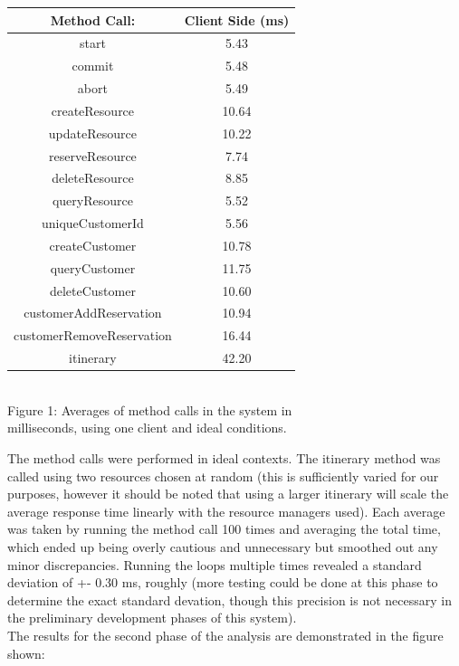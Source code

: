 \documentclass[letterpaper,12pt]{article}
\begin{document}
	\begin{center}
		\begin{tabular}{ |c|c| } 
			\hline
			Method Call: & Client Side (ms) \\
			\hline
			start & 5.43  \\ 
			commit & 5.48  \\ 
			abort & 5.49  \\ 
			createResource & 10.64  \\ 
			updateResource & 10.22  \\ 
			reserveResource & 7.74  \\ 
			deleteResource & 8.85  \\ 
			queryResource & 5.52  \\ 
			uniqueCustomerId & 5.56  \\ 
			createCustomer & 10.78 \\
			queryCustomer & 11.75 \\ 
			deleteCustomer & 10.60 \\ 
			customerAddReservation & 10.94 \\ 
			customerRemoveReservation & 16.44 \\
			itinerary & 42.20\\
			\hline
		\end{tabular}\\
		Figure 1: Averages of method calls in the system in \\milliseconds, using one client and ideal conditions.
	\end{center}
	The method calls were performed in ideal contexts. The itinerary method was called using two resources chosen at random (this is sufficiently varied for our purposes, however it should be noted that using a larger itinerary will scale the average response time linearly with the resource managers used). Each average was taken by running the method call 100 times and averaging the total time, which ended up being overly cautious and unnecessary but smoothed out any minor discrepancies. Running the loops multiple times revealed a standard deviation of +- 0.30 ms, roughly (more testing could be done at this phase to determine the exact standard devation, though this precision is not necessary in the preliminary development phases of this system).\\
	
	The results for the second phase of the analysis are demonstrated in the figure shown:\\
\end{document}
